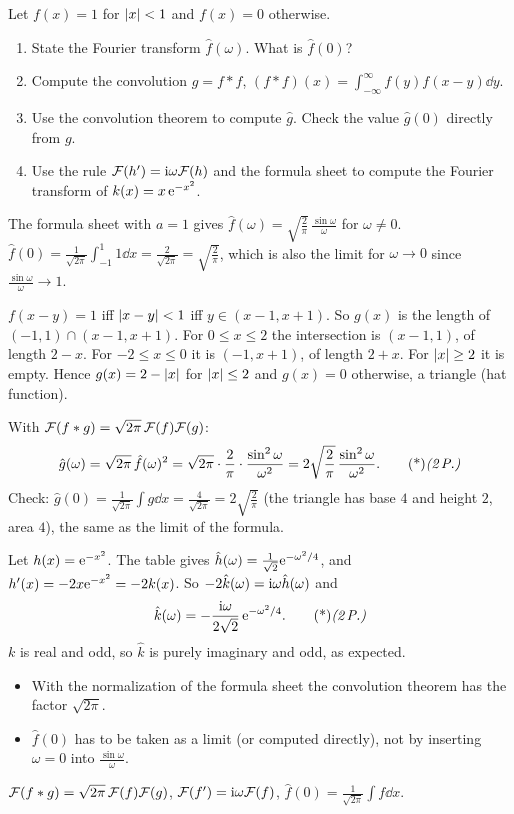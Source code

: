 Let $f(x)=1$ for $\lvert x\rvert<1$ and $f(x)=0$ otherwise.
\begin{enumerate}
\item State the Fourier transform $\hat f(\omega)$. What is $\hat f(0)$?
\item Compute the convolution $g=f\ast f$, $(f\ast f)(x)=\int_{-\infty}^\infty f(y)f(x-y)\dd y$.
\item Use the convolution theorem to compute $\hat g$. Check the value $\hat g(0)$ directly from $g$.
\item Use the rule $\mathcal{F}(h')=\mathrm{i}\omega\mathcal{F}(h)$ and the formula sheet to compute the Fourier transform of $k(x)=x\,\mathrm{e}^{-x^2}$.
\end{enumerate}

\begin{solution}
 The formula sheet with $a=1$ gives $\hat f(\omega)=\sqrt{\frac2\pi}\,\frac{\sin\omega}{\omega}$ for $\omega\neq0$. 
$\hat f(0)=\frac1{\sqrt{2\pi}}\int_{-1}^1 1\dd x=\frac2{\sqrt{2\pi}}=\sqrt{\frac2\pi}$, which is also the limit for $\omega\to0$ since $\frac{\sin\omega}\omega\to1$. 

 $f(x-y)=1$ iff $\lvert x-y\rvert<1$ iff $y\in(x-1,x+1)$. So $g(x)$ is the length of $(-1,1)\cap(x-1,x+1)$. 
For $0\le x\le2$ the intersection is $(x-1,1)$, of length $2-x$. For $-2\le x\le0$ it is $(-1,x+1)$, of length $2+x$. For $\lvert x\rvert\ge2$ it is empty. 
Hence $g(x)=2-\lvert x\rvert$ for $\lvert x\rvert\le2$ and $g(x)=0$ otherwise, a triangle (hat function). 

 With $\mathcal{F}(f\ast g)=\sqrt{2\pi}\,\mathcal{F}(f)\mathcal{F}(g)$:
\[
\hat g(\omega)=\sqrt{2\pi}\,\hat f(\omega)^2=\sqrt{2\pi}\cdot\frac2\pi\cdot\frac{\sin^2\omega}{\omega^2}=2\sqrt{\frac2\pi}\,\frac{\sin^2\omega}{\omega^2}.\ptd{2}
\]
Check: $\hat g(0)=\frac1{\sqrt{2\pi}}\int g\dd x=\frac{4}{\sqrt{2\pi}}=2\sqrt{\frac2\pi}$ (the triangle has base $4$ and height $2$, area $4$), the same as the limit of the formula. 

 Let $h(x)=\mathrm{e}^{-x^2}$. The table gives $\hat h(\omega)=\frac1{\sqrt2}\mathrm{e}^{-\omega^2/4}$, and $h'(x)=-2x\mathrm{e}^{-x^2}=-2k(x)$. 
So $-2\hat k(\omega)=\mathrm{i}\omega\hat h(\omega)$ and
\[
\hat k(\omega)=-\frac{\iu\omega}{2\sqrt2}\,\e^{-\omega^2/4}.\ptd{2}
\]
$k$ is real and odd, so $\hat k$ is purely imaginary and odd, as expected.

\begin{trap}
\begin{itemize}
\item With the normalization of the formula sheet the convolution theorem has the factor $\sqrt{2\pi}$.
\item $\hat f(0)$ has to be taken as a limit (or computed directly), not by inserting $\omega=0$ into $\frac{\sin\omega}{\omega}$.
\end{itemize}
\end{trap}
\begin{heart}
$\mathcal{F}(f\ast g)=\sqrt{2\pi}\,\mathcal{F}(f)\mathcal{F}(g)$, $\mathcal{F}(f')=\mathrm{i}\omega\mathcal{F}(f)$, $\hat f(0)=\frac1{\sqrt{2\pi}}\int f\dd x$.
\end{heart}
\end{solution}

